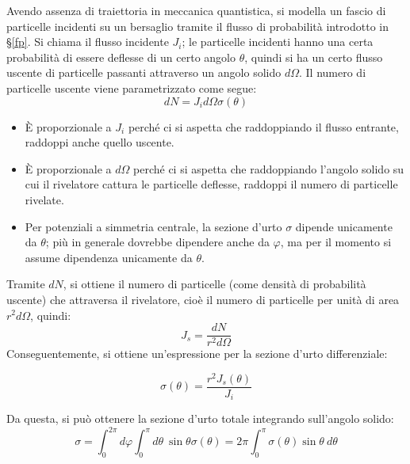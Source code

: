 \documentclass[11pt, a4paper]{scrartcl} %
\numberwithin{equation}{subsection}
\theoremstyle{style2}
\theoremstyle{style1}
\newenvironment{boxenv}[1][]{
    \begin{eqbox}[#1]
    }{
   \end{eqbox}
}
\begin{document}
Avendo assenza di traiettoria in meccanica quantistica, si modella un fascio di particelle incidenti su un bersaglio tramite il flusso di probabilit\`a introdotto in \S\ref{fp}.
Si chiama il flusso incidente $J_i$; le particelle incidenti hanno una certa probabilit\`a di essere deflesse di un certo angolo $\theta $, quindi si ha un certo flusso uscente di particelle passanti attraverso un angolo solido $d\Omega $.
Il numero di particelle uscente viene parametrizzato come segue:
\begin{equation}
	dN = J_i d\Omega \sigma (\theta )
\end{equation}
\begin{itemize}
	\item \`E proporzionale a $J_i$ perch\'e ci si aspetta che raddoppiando il flusso entrante, raddoppi anche quello uscente.
	\item \`E proporzionale a $d\Omega $ perch\'e ci si aspetta che raddoppiando l'angolo solido su cui il rivelatore cattura le particelle deflesse, raddoppi il numero di particelle rivelate.
	\item Per potenziali a simmetria centrale, la sezione d'urto $\sigma $ dipende unicamente da $\theta $; pi\`u in generale dovrebbe dipendere anche da $\varphi $, ma per il momento si assume dipendenza unicamente da $\theta $.
\end{itemize}
Tramite $dN$, si ottiene il numero di particelle (come densit\`a di probabilit\`a uscente) che attraversa il rivelatore, cio\`e il numero di particelle per unit\`a di area $r^2 d\Omega $, quindi:
\begin{equation}
	J_s = \frac{d N}{ r^2 d\Omega } 
\end{equation}
Conseguentemente, si ottiene un'espressione per la sezione d'urto differenziale:
\begin{boxenv}[]
\begin{equation}
	\sigma (\theta  ) = \frac{r^2 J_s(\theta )}{J_i}
\end{equation}
\end{boxenv}
\noindent Da questa, si pu\`o ottenere la sezione d'urto totale integrando sull'angolo solido:
\[
\sigma  = \int_0^{2\pi} d\varphi \int_{0} ^\pi d\theta \  \sin\theta \sigma  (\theta   ) = 2\pi \int_{0} ^\pi \sigma(  \theta)  \sin\theta \ d\theta 
\] 
\end{document}
